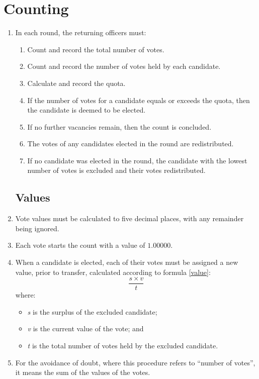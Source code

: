 \documentclass[12pt]{article}
\newenvironment{steps}{\begin{enumerate}[1.]}{\end{enumerate}}
\begin{document}
\section{Counting}
\begin{enumerate}
    \item In each round, the returning officers must:
    \begin{steps}
        \item Count and record the total number of votes.
        \item Count and record the number of votes held by each candidate.
        \item Calculate and record the quota.
        \item If the number of votes for a candidate equals or exceeds the quota, then the candidate is deemed to be elected.
        \item If no further vacancies remain, then the count is concluded.
        \item The votes of any candidates elected in the round are redistributed.
        \item If no candidate was elected in the round, the candidate with the lowest number of votes is excluded and their votes redistributed.
    \end{steps}
    \subsection{Values}
    \item Vote values must be calculated to five decimal places, with any remainder being ignored.
    \item Each vote starts the count with a value of \(1.00000\).
    \item When a candidate is elected, each of their votes must be assigned a new value, prior to transfer, calculated according to formula \ref{value}:
    \begin{equation}\label{value}
        \frac{s\times v}{t}
    \end{equation}
    where:
    \begin{itemize}
        \item \textit{s} is the surplus of the excluded candidate;
        \item \textit{v} is the current value of the vote; and
        \item \textit{t} is the total number of votes held by the excluded candidate.
    \end{itemize}
    \item For the avoidance of doubt, where this procedure refers to ``number of votes'', it means the sum of the values of the votes.

\end{enumerate}
\end{document}
